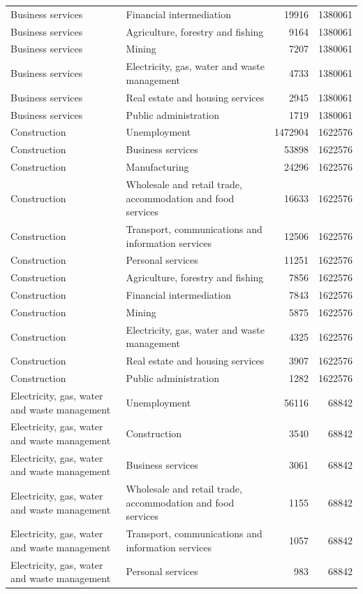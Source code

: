 \begin{longtable}{llrr}
Business services & Financial intermediation & 19916 & 1380061 \\
Business services & Agriculture, forestry and fishing & 9164 & 1380061 \\
Business services & Mining & 7207 & 1380061 \\
Business services & Electricity, gas, water and waste management & 4733 & 1380061 \\
Business services & Real estate and housing services & 2945 & 1380061 \\
Business services & Public administration & 1719 & 1380061 \\
Construction & Unemployment & 1472904 & 1622576 \\
Construction & Business services & 53898 & 1622576 \\
Construction & Manufacturing & 24296 & 1622576 \\
Construction & Wholesale and retail trade, accommodation and food services & 16633 & 1622576 \\
Construction & Transport, communications and information services & 12506 & 1622576 \\
Construction & Personal services & 11251 & 1622576 \\
Construction & Agriculture, forestry and fishing & 7856 & 1622576 \\
Construction & Financial intermediation & 7843 & 1622576 \\
Construction & Mining & 5875 & 1622576 \\
Construction & Electricity, gas, water and waste management & 4325 & 1622576 \\
Construction & Real estate and housing services & 3907 & 1622576 \\
Construction & Public administration & 1282 & 1622576 \\
Electricity, gas, water and waste management & Unemployment & 56116 & 68842 \\
Electricity, gas, water and waste management & Construction & 3540 & 68842 \\
Electricity, gas, water and waste management & Business services & 3061 & 68842 \\
Electricity, gas, water and waste management & Wholesale and retail trade, accommodation and food services & 1155 & 68842 \\
Electricity, gas, water and waste management & Transport, communications and information services & 1057 & 68842 \\
Electricity, gas, water and waste management & Personal services & 983 & 68842 \\

\end{longtable}
